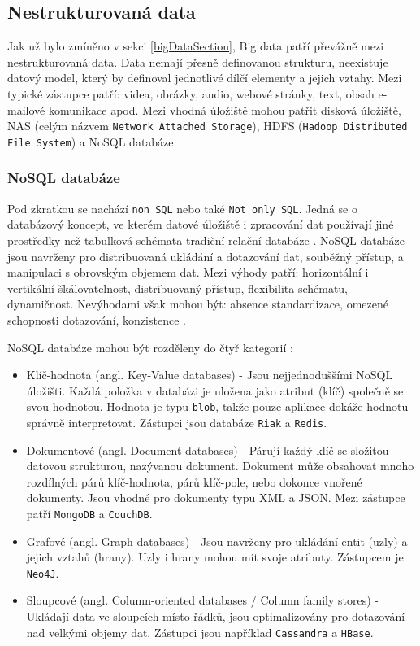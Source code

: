 \subsection{Nestrukturovaná data}
Jak už bylo zmíněno v sekci \ref{bigDataSection}, Big data patří převážně mezi nestrukturovaná data. Data nemají přesně definovanou strukturu, neexistuje datový model, který by definoval jednotlivé dílčí elementy a jejich vztahy. Mezi typické zástupce patří: videa, obrázky, audio, webové stránky, text, obsah e-mailové komunikace apod. Mezi vhodná úložiště mohou patřit disková úložiště, NAS (celým názvem \texttt{Network Attached Storage}), HDFS (\texttt{Hadoop Distributed File System}) a NoSQL databáze.

\subsubsection{NoSQL databáze}
Pod zkratkou se nachází \texttt{non SQL} nebo také \texttt{Not only SQL}. Jedná se o databázový koncept, ve kterém datové úložiště i zpracování dat používají jiné prostředky než tabulková schémata tradiční relační databáze \cite{noSqlWiki}. NoSQL databáze jsou navrženy pro distribuovaná ukládání a dotazování dat, souběžný přístup, a manipulaci s obrovským objemem dat. Mezi výhody patří: horizontální i vertikální škálovatelnost, distribuovaný přístup, flexibilita schématu, dynamičnost. Nevýhodami však mohou být: absence standardizace, omezené schopnosti dotazování, konzistence \cite{noSqlIntro}.

\vspace{0.5cm}
\noindent NoSQL databáze mohou být rozděleny do čtyř kategorií \cite{noSqlOverview}:
\begin{itemize}
    \item Klíč-hodnota (angl. Key-Value databases) - Jsou nejjednoduššími NoSQL úložišti. Každá položka v databázi je uložena jako atribut (klíč) společně se svou hodnotou. Hodnota je typu \texttt{blob}, takže pouze aplikace dokáže hodnotu správně interpretovat. Zástupci jsou databáze \texttt{Riak} a \texttt{Redis}.
    
    \item Dokumentové (angl. Document databases) - Párují každý klíč se složitou datovou strukturou, nazývanou dokument. Dokument může obsahovat mnoho rozdílných párů klíč-hodnota, párů klíč-pole, nebo dokonce vnořené dokumenty. Jsou vhodné pro dokumenty typu XML a JSON. Mezi zástupce patří \texttt{MongoDB} a \texttt{CouchDB}.
    
    \item Grafové (angl. Graph databases) - Jsou navrženy pro ukládání entit (uzly) a jejich vztahů (hrany). Uzly i hrany mohou mít svoje atributy. Zástupcem je \texttt{Neo4J}.
    
    \item Sloupcové (angl. Column-oriented databases / Column family stores) - Ukládají data ve sloupcích místo řádků, jsou optimalizovány pro dotazování nad velkými objemy dat. Zástupci jsou například \texttt{Cassandra} a \texttt{HBase}.
\end{itemize}

